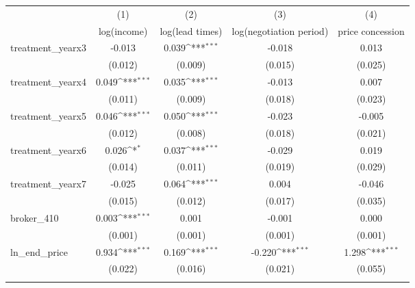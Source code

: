 {
\def\sym#1{\ifmmode^{#1}\else\(^{#1}\)\fi}
\begin{tabular}{l*{4}{c}}
\toprule
            &\multicolumn{1}{c}{(1)}&\multicolumn{1}{c}{(2)}&\multicolumn{1}{c}{(3)}&\multicolumn{1}{c}{(4)}\\
            &\multicolumn{1}{c}{log(income)}&\multicolumn{1}{c}{log(lead times)}&\multicolumn{1}{c}{log(negotiation period)}&\multicolumn{1}{c}{price concession}\\
\midrule
treatment\_yearx3&      -0.013         &       0.039\sym{***}&      -0.018         &       0.013         \\
            &     (0.012)         &     (0.009)         &     (0.015)         &     (0.025)         \\
\addlinespace
treatment\_yearx4&       0.049\sym{***}&       0.035\sym{***}&      -0.013         &       0.007         \\
            &     (0.011)         &     (0.009)         &     (0.018)         &     (0.023)         \\
\addlinespace
treatment\_yearx5&       0.046\sym{***}&       0.050\sym{***}&      -0.023         &      -0.005         \\
            &     (0.012)         &     (0.008)         &     (0.018)         &     (0.021)         \\
\addlinespace
treatment\_yearx6&       0.026\sym{*}  &       0.037\sym{***}&      -0.029         &       0.019         \\
            &     (0.014)         &     (0.011)         &     (0.019)         &     (0.029)         \\
\addlinespace
treatment\_yearx7&      -0.025         &       0.064\sym{***}&       0.004         &      -0.046         \\
            &     (0.015)         &     (0.012)         &     (0.017)         &     (0.035)         \\
\addlinespace
broker\_410  &       0.003\sym{***}&       0.001         &      -0.001         &       0.000         \\
            &     (0.001)         &     (0.001)         &     (0.001)         &     (0.001)         \\
\addlinespace
ln\_end\_price&       0.934\sym{***}&       0.169\sym{***}&      -0.220\sym{***}&       1.298\sym{***}\\
            &     (0.022)         &     (0.016)         &     (0.021)         &     (0.055)         \\
\addlinespace

\end{tabular}}
